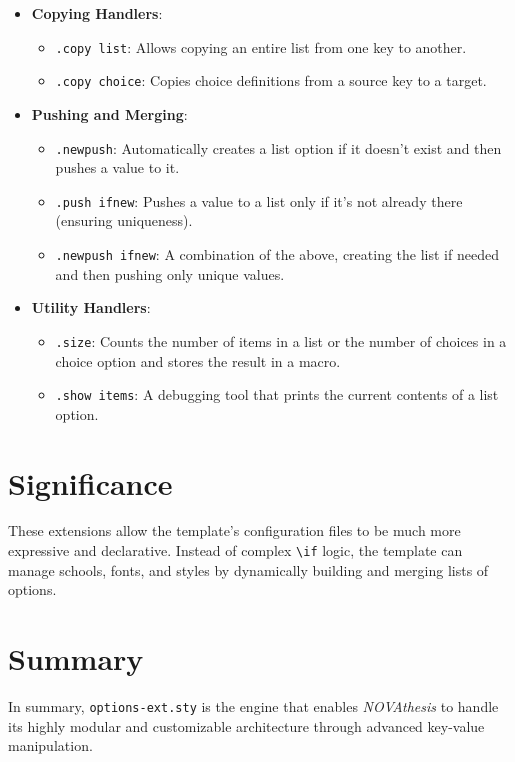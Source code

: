 \begin{itemize}
    \item \textbf{Copying Handlers}: 
        \begin{itemize}
            \item \texttt{.copy list}: Allows copying an entire list from one key to another.
            \item \texttt{.copy choice}: Copies choice definitions from a source key to a target.
        \end{itemize}
    \item \textbf{Pushing and Merging}:
        \begin{itemize}
            \item \texttt{.newpush}: Automatically creates a list option if it doesn't exist and then pushes a value to it.
            \item \texttt{.push ifnew}: Pushes a value to a list only if it's not already there (ensuring uniqueness).
            \item \texttt{.newpush ifnew}: A combination of the above, creating the list if needed and then pushing only unique values.
        \end{itemize}
    \item \textbf{Utility Handlers}:
        \begin{itemize}
            \item \texttt{.size}: Counts the number of items in a list or the number of choices in a choice option and stores the result in a macro.
            \item \texttt{.show items}: A debugging tool that prints the current contents of a list option.
        \end{itemize}
\end{itemize}

\section{Significance}
These extensions allow the template's configuration files to be much more expressive and declarative. Instead of complex \texttt{\textbackslash if} logic, the template can manage schools, fonts, and styles by dynamically building and merging lists of options.

\section{Summary}
In summary, \texttt{options-ext.sty} is the engine that enables \emph{NOVAthesis} to handle its highly modular and customizable architecture through advanced key-value manipulation.
